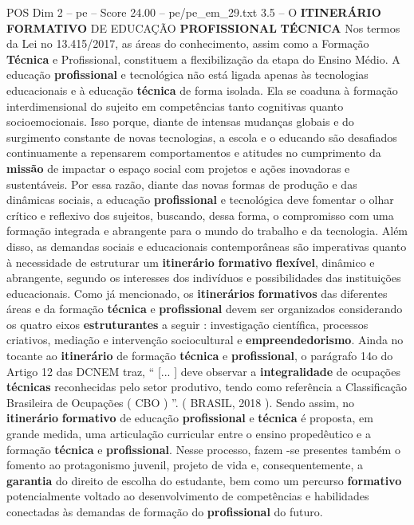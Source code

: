 \begin{textsample}{POS Dim 2 – pe – Score 24.00 – pe/pe\_em\_29.txt}  \label{ex:f2_pos_251}
3.5 – O \textbf{ITINERÁRIO} \textbf{FORMATIVO} DE EDUCAÇÃO \textbf{PROFISSIONAL} \textbf{TÉCNICA} Nos termos da Lei no 13.415/2017, as áreas do conhecimento, assim como a Formação \textbf{Técnica} e Profissional, constituem a flexibilização da etapa do Ensino Médio.
A educação \textbf{profissional} e tecnológica não está ligada apenas às tecnologias educacionais e à educação \textbf{técnica} de forma isolada.
Ela se coaduna à formação interdimensional do sujeito em competências tanto cognitivas quanto socioemocionais.
Isso porque, diante de intensas mudanças globais e do surgimento constante de novas tecnologias, a escola e o educando são desafiados continuamente a repensarem comportamentos e atitudes no cumprimento da \textbf{missão} de impactar o espaço social com projetos e ações inovadoras e sustentáveis.
Por essa razão, diante das novas formas de produção e das dinâmicas sociais, a educação \textbf{profissional} e tecnológica deve fomentar o olhar crítico e reflexivo dos sujeitos, buscando, dessa forma, o compromisso com uma formação integrada e abrangente para o mundo do trabalho e da tecnologia.
Além disso, as demandas sociais e educacionais contemporâneas são imperativas quanto à necessidade de estruturar um \textbf{itinerário} \textbf{formativo} \textbf{flexível}, dinâmico e abrangente, segundo os interesses dos indivíduos e possibilidades das instituições educacionais.
Como já mencionado, os \textbf{itinerários} \textbf{formativos} das diferentes áreas e da formação \textbf{técnica} e \textbf{profissional} devem ser organizados considerando os quatro eixos \textbf{estruturantes} a seguir : investigação científica, processos criativos, mediação e intervenção sociocultural e \textbf{empreendedorismo}.
Ainda no tocante ao \textbf{itinerário} de formação \textbf{técnica} e \textbf{profissional}, o parágrafo 14o do Artigo 12 das DCNEM traz, “ [... ] deve observar a \textbf{integralidade} de ocupações \textbf{técnicas} reconhecidas pelo setor produtivo, tendo como referência a Classificação Brasileira de Ocupações ( CBO ) ”. ( BRASIL, 2018 ).
Sendo assim, no \textbf{itinerário} \textbf{formativo} de educação \textbf{profissional} e \textbf{técnica} é proposta, em grande medida, uma articulação curricular entre o ensino propedêutico e a formação \textbf{técnica} e \textbf{profissional}.
Nesse processo, fazem -se presentes também o fomento ao protagonismo juvenil, projeto de vida e, consequentemente, a \textbf{garantia} do direito de escolha do estudante, bem como um percurso \textbf{formativo} potencialmente voltado ao desenvolvimento de competências e habilidades conectadas às demandas de formação do \textbf{profissional} do futuro.

\end{textsample}
